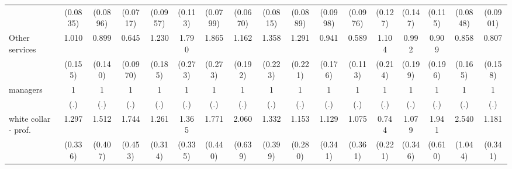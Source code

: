 {\begin{tabular}{l*{16}{c}}
                    &    (0.0835)         &    (0.0896)         &    (0.0717)         &    (0.0957)         &     (0.113)         &    (0.0799)         &    (0.0670)         &    (0.0815)         &    (0.0889)         &    (0.0998)         &    (0.0976)         &     (0.127)         &     (0.147)         &     (0.115)         &    (0.0848)         &    (0.0901)         \\
[1em]
Other services      &       1.010         &       0.899         &       0.645\sym{**} &       1.230         &       1.790\sym{***}&       1.865\sym{***}&       1.162         &       1.358         &       1.291         &       0.941         &       0.589\sym{**} &       1.104         &       0.992         &       0.909         &       0.858         &       0.807         \\
                    &     (0.155)         &     (0.140)         &    (0.0970)         &     (0.185)         &     (0.273)         &     (0.273)         &     (0.192)         &     (0.223)         &     (0.221)         &     (0.176)         &     (0.113)         &     (0.214)         &     (0.199)         &     (0.196)         &     (0.165)         &     (0.158)         \\
[1em]
managers            &           1         &           1         &           1         &           1         &           1         &           1         &           1         &           1         &           1         &           1         &           1         &           1         &           1         &           1         &           1         &           1         \\
                    &         (.)         &         (.)         &         (.)         &         (.)         &         (.)         &         (.)         &         (.)         &         (.)         &         (.)         &         (.)         &         (.)         &         (.)         &         (.)         &         (.)         &         (.)         &         (.)         \\
[1em]
white collar - prof.&       1.297         &       1.512         &       1.744\sym{*}  &       1.261         &       1.365         &       1.771\sym{*}  &       2.060\sym{*}  &       1.332         &       1.153         &       1.129         &       1.075         &       0.744         &       1.079         &       1.941\sym{*}  &       2.540\sym{*}  &       1.181         \\
                    &     (0.336)         &     (0.407)         &     (0.453)         &     (0.314)         &     (0.335)         &     (0.440)         &     (0.639)         &     (0.399)         &     (0.280)         &     (0.341)         &     (0.361)         &     (0.221)         &     (0.346)         &     (0.610)         &     (1.044)         &     (0.341)         \\

\end{tabular}}
